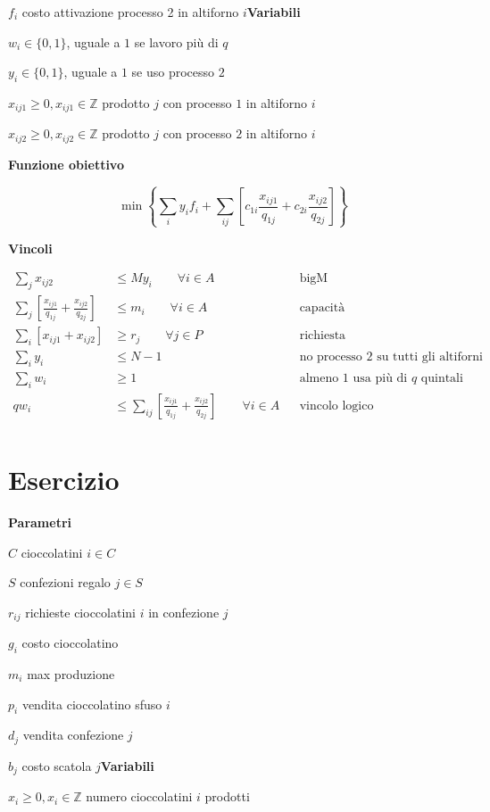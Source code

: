 \documentclass[10pt,a4paper,twoside,openright]{book}
\newcounter{es}
\newcommand{\Es}{
	\stepcounter{es}
	\section{Esercizio \arabic{es}}
	}
\newcommand{\Par}{\textbf{Parametri}}
\newcommand{\Var}{\textbf{Variabili}}
\newcommand{\Fob}{\textbf{Funzione obiettivo}}
\newcommand{\Vin}{\textbf{Vincoli}}
\begin{document}
$f_{i}$ costo attivazione processo 2 in altiforno $i$\Var

$w_{i} \in \{0,1\}$, uguale a $1$ se lavoro più di $q$

$y_{i} \in \{0,1\}$, uguale a $1$ se uso processo $2$

$x_{ij1} \geq 0,x_{ij1} \in \mathbb{Z}$ prodotto $j$ con processo $1$ in altiforno $i$

$x_{ij2} \geq 0,x_{ij2} \in \mathbb{Z}$ prodotto $j$ con processo $2$ in altiforno $i$

\Fob

\begin{equation*}
	\min \left\{\sum _{i} y_{i} f_{i} +\sum _{ij}\left[ c_{1i}\frac{x_{ij1}}{q_{1j}} +c_{2i}\frac{x_{ij2}}{q_{2j}}\right]\right\}
\end{equation*}

\Vin

\begin{align*}
	\sum _{j} x_{ij2} & \leq My_{i} \qquad\forall i\in A && \text{bigM} \\
	\sum _{j}\left[\frac{x_{ij1}}{q_{1j}} +\frac{x_{ij2}}{q_{2j}}\right] & \leq m_{i} \qquad\forall i\in A && \text{capacità} \\
	\sum _{i}[ x_{ij1} +x_{ij2}] & \geq r_{j} \qquad\forall j\in P && \text{richiesta} \\
	\sum _{i} y_{i} & \leq N-1 && \text{no processo $2$ su tutti gli altiforni} \\
	\sum _{i} w_{i} & \geq 1 && \text{almeno 1 usa più di $q$ quintali} \\
	qw_{i} & \leq \sum _{ij}\left[\frac{x_{ij1}}{q_{1j}} +\frac{x_{ij2}}{q_{2j}}\right] \qquad\forall i\in A && \text{vincolo logico} \\
\end{align*}

\Es

\Par

$C$ cioccolatini $i\in C$

$S$ confezioni regalo $j\in S$

$r_{ij}$ richieste cioccolatini $i$ in confezione $j$

$g_{i}$ costo cioccolatino

$m_{i}$ max produzione

$p_{i}$ vendita cioccolatino sfuso $i$

$d_{j}$ vendita confezione $j$

$b_{j}$ costo scatola $j$\Var

$x_{i} \geq 0,x_{i} \in \mathbb{Z}$ numero cioccolatini $i$ prodotti
\end{document}
